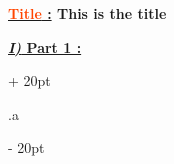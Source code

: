 \documentclass[a4paper, 12pt, twoside]{article}
\renewcommand{\emph}{\textcolor{ff4500}}
\newcommand{\ind}[1][20pt]{\advance\leftskip + #1}
\newcommand{\deind}[1][20pt]{\advance\leftskip - #1}
\newenvironment{indentedenv}[1][20pt]{\par \ind[#1]}{\par \deind}
\newenvironment{indt}[2][20pt]{#2 \begin{indentedenv}[#1]}{\end{indentedenv}} %
\newcommand{\thetitle}[2]{\begin{center}\textbf{{\LARGE \underline{\emph{#1} :}} {\Large #2}}\end{center}}
\newcommand{\bmainpart}[2][$\!\!$]{\underline{\large \textbf{\textit{#1} #2}}}
\begin{document}
    \thetitle{Title}{This is the title}    
    
    
    \begin{indt}{\bmainpart[I)]{Part 1 :}}
        
        .a
        
    \end{indt}
    
    
\end{document}

